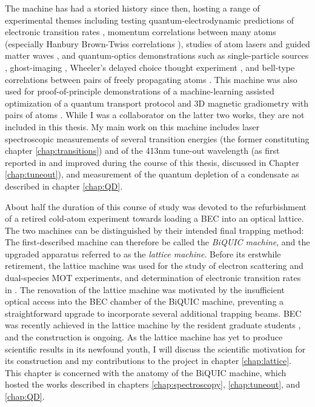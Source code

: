 	The machine has had a storied history since then, hosting a range of experimental themes including testing quantum-electrodynamic predictions of electronic transition rates \cite{Dall08}, momentum correlations between many atoms \cite{Hodgman17,Dall13,Manning13} (especially Hanbury Brown-Twiss correlations \cite{Manning10,Dall11a,Hodgman11,Rugway11,Rugway13}), studies of atom lasers \cite{Dall07_laser,Dall08a,Henson18_BCR,Manning10} and guided matter waves \cite{Dall10, Dall11a,Dall11}, and quantum-optics demonstrations such as single-particle sources \cite{Manning14}, ghost-imaging \cite{Khakimov16,Hodgman19}, Wheeler's delayed choice thought experiment \cite{Manning15}, and bell-type correlations between pairs of freely propagating atoms \cite{Shin19}.
	This machine was also used for proof-of-principle demonstrations of a machine-learning assisted optimization of a quantum transport protocol \cite{Henson18_ML} and 3D magnetic gradiometry with pairs of atoms \cite{Shin20}.
	While I was a collaborator on the latter two works, they are not included in this thesis.
	My main work on this machine includes laser spectroscopic measurements of several transition energies \cite{Ross20,Thomas20} (the former constituting chapter \ref{chap:transitions}) and of the 413nm tune-out wavelength (as first reported in \cite{Henson15} and improved during the course of this thesis, discussed in Chapter \ref{chap:tuneout}), and measurement of the quantum depletion of a condensate as described in chapter \ref{chap:QD}.
	

	About half the duration of this course of study was devoted to the refurbishment of a retired cold-atom experiment towards loading a \mhe BEC into an optical lattice.
	The two machines can be distinguished by their intended final trapping method: The first-described machine can therefore be called the \emph{BiQUIC machine}, and the upgraded apparatus referred to as the \emph{lattice machine}.
	Before its erstwhile retirement, the lattice machine was used for the study of electron scattering and  dual-species MOT experiments\cite{Uhlmann05,Byron10,Byron10a}, and determination of electronic transition rates \cite{Hodgman09_23P} in \mhe.
	The renovation of the lattice machine was motivated by the insufficient optical access into the BEC chamber of the BiQUIC machine, preventing a straightforward upgrade to incorporate several additional trapping beams.
	BEC was recently achieved in the lattice machine by the resident graduate students \cite{Abbas21}, and the construction is ongoing.
	As the lattice machine has yet to produce scientific results in its newfound youth, I will discuss the scientific motivation for its construction and my contributions to the project in chapter \ref{chap:lattice}.
	This chapter is concerned with the anatomy of the BiQUIC machine, which hosted the works described in chapters \ref{chap:spectroscopy}, \ref{chap:tuneout}, and \ref{chap:QD}.

